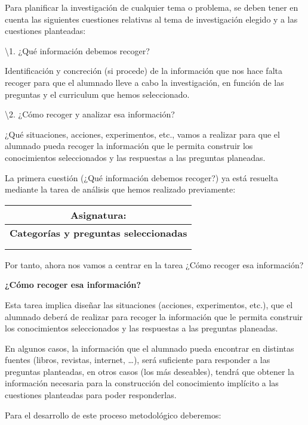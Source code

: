 \documentclass[
]{article}
\begin{document}
Para planificar la investigación de cualquier tema o problema, se deben
tener en cuenta las siguientes cuestiones relativas al tema de
investigación elegido y a las cuestiones planteadas:

\textbackslash1. ¿Qué información debemos recoger?

Identificación y concreción (si procede) de la información que nos hace
falta recoger para que el alumnado lleve a cabo la investigación, en
función de las preguntas y el curriculum que hemos seleccionado.

\textbackslash2. ¿Cómo recoger y analizar esa información?

¿Qué situaciones, acciones, experimentos, etc., vamos a realizar para
que el alumnado pueda recoger la información que le permita construir
los conocimientos seleccionados y las respuestas a las preguntas
planeadas.

La primera cuestión (¿Qué información debemos recoger?) ya está resuelta
mediante la tarea de análisis que hemos realizado previamente:

\begin{longtable}[]{@{}c@{}}
\toprule
\textbf{Asignatura:} \\
\midrule
\endhead
\textbf{Categorías y preguntas seleccionadas} \\
 \\
 \\
\bottomrule
\end{longtable}

Por tanto, ahora nos vamos a centrar en la tarea ¿Cómo recoger esa
información?

\textbf{¿Cómo recoger esa información?}

Esta tarea implica diseñar las situaciones (acciones, experimentos,
etc.), que el alumnado deberá de realizar para recoger la información
que le permita construir los conocimientos seleccionados y las
respuestas a las preguntas planeadas.

En algunos casos, la información que el alumnado pueda encontrar en
distintas fuentes (libros, revistas, internet, \ldots), será suficiente
para responder a las preguntas planteadas, en otros casos (los más
deseables), tendrá que obtener la información necesaria para la
construcción del conocimiento implícito a las cuestiones planteadas para
poder responderlas.

Para el desarrollo de este proceso metodológico deberemos:
\end{document}
